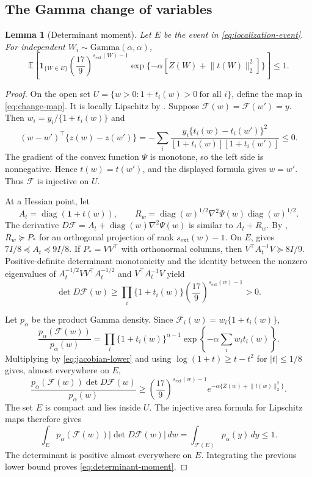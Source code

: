 \documentclass[11pt]{article}
\newtheorem{lemma}[lemma]{Lemma}
\theoremstyle{definition}
\theoremstyle{remark}
\DeclareMathOperator{\diag}{diag}
\newcommand{\EE}{\mathbb E}
\newcommand{\one}{\bm 1}
\newcommand{\norm}[1]{\lVert #1\rVert}
\newcommand{\abs}[1]{\lvert #1\rvert}
\begin{document}
\subsection{The Gamma change of variables}

\begin{lemma}[Determinant moment]
\label{lem:determinant-moment}
Let $E$ be the event in \eqref{eq:localization-event}.  For independent
$W_i\sim\mathrm{Gamma}(\alpha,\alpha)$,
\begin{equation}\label{eq:determinant-moment}
 \EE\left[\bm 1_{\{W\in E\}}
 \left(\frac{17}{9}\right)^{s_{\mathrm{ext}}(W)-1}
 \exp\{-\alpha[Z(W)+\norm{t(W)}_2^2]\}\right]\le1.
\end{equation}
\end{lemma}

\begin{proof}
On the open set
$U=\{w>0:1+t_i(w)>0\ \text{for all }i\}$, define the map in
\eqref{eq:change-map}.  It is locally Lipschitz by .
Suppose $\mathcal F(w)=\mathcal F(w')=y$.  Then
$w_i=y_i/\{1+t_i(w)\}$ and
\[
 (w-w')^\top\{z(w)-z(w')\}
 =-\sum_i\frac{y_i\{t_i(w)-t_i(w')\}^2}
 {[1+t_i(w)][1+t_i(w')]}\le0.
\]
The gradient of the convex function $\Psi$ is monotone, so the left side is
nonnegative.  Hence $t(w)=t(w')$, and the displayed formula gives $w=w'$.
Thus $\mathcal F$ is injective on $U$.

At a Hessian point, let
\[
 A_t=\diag(\one+t(w)),\qquad
 R_w=\diag(w)^{1/2}\nabla^2\Psi(w)\diag(w)^{1/2}.
\]
The derivative $D\mathcal F=A_t+\diag(w)\nabla^2\Psi(w)$ is similar to
$A_t+R_w$.  By ,
$R_w\succeq P_*$ for an orthogonal projection of rank
$s_{\mathrm{ext}}(w)-1$.  On $E$,  gives
$7I/8\preceq A_t\preceq9I/8$.  If $P_*=VV^\top$ with orthonormal columns,
then $V^\top A_t^{-1}V\succeq8I/9$.  Positive-definite determinant
monotonicity and the identity between the nonzero eigenvalues of
$A_t^{-1/2}VV^\top A_t^{-1/2}$ and $V^\top A_t^{-1}V$ yield
\begin{equation}\label{eq:jacobian-lower}
 \det D\mathcal F(w)
 \ge\prod_i\{1+t_i(w)\}
 \left(\frac{17}{9}\right)^{s_{\mathrm{ext}}(w)-1}>0.
\end{equation}

Let $p_\alpha$ be the product Gamma density.  Since
$\mathcal F_i(w)=w_i\{1+t_i(w)\}$,
\[
 \frac{p_\alpha(\mathcal F(w))}{p_\alpha(w)}
 =\prod_i\{1+t_i(w)\}^{\alpha-1}
   \exp\left\{-\alpha\sum_iw_it_i(w)\right\}.
\]
Multiplying by \eqref{eq:jacobian-lower} and using
$\log(1+t)\ge t-t^2$ for $\abs{t}\le1/8$ gives, almost everywhere on $E$,
\[
 \frac{p_\alpha(\mathcal F(w))\det D\mathcal F(w)}{p_\alpha(w)}
 \ge\left(\frac{17}{9}\right)^{s_{\mathrm{ext}}(w)-1}
 e^{-\alpha\{Z(w)+\norm{t(w)}_2^2\}}.
\]
The set $E$ is compact and lies inside $U$.  The injective area formula for Lipschitz maps
\citep[Chapter 3]{evansgariepy2015} therefore gives
\[
 \int_Ep_\alpha(\mathcal F(w))\abs{\det D\mathcal F(w)}\,dw
 =\int_{\mathcal F(E)}p_\alpha(y)\,dy\le1.
\]
The determinant is positive almost everywhere on $E$.  Integrating the
previous lower bound proves \eqref{eq:determinant-moment}.
\end{proof}
\end{document}
